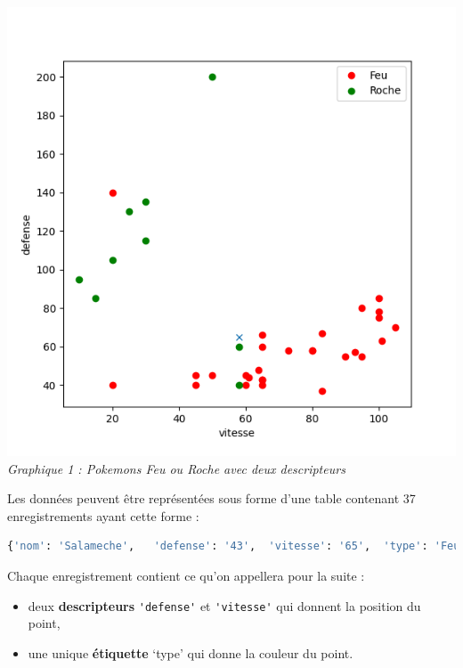 \documentclass[
  11pt,
]{article}
\newcommand{\passthrough}[1]{#1}
\providecommand{\tightlist}{%
  \setlength{\itemsep}{0pt}\setlength{\parskip}{0pt}}
\newcounter{def}
\begin{document}
\includegraphics[width=1\textwidth,height=\textheight]{images/pokemon-feu-roche-vitesse-defense.png}\\

\emph{Graphique 1 : Pokemons Feu ou Roche avec deux descripteurs}

Les données peuvent être représentées sous forme d'une table contenant
37 enregistrements ayant cette forme :

\begin{lstlisting}[language=Python]
{'nom': 'Salameche',   'defense': '43',  'vitesse': '65',  'type': 'Feu'}
\end{lstlisting}

Chaque enregistrement contient ce qu'on appellera pour la suite :

\begin{itemize}
\tightlist
\item
  deux \textbf{descripteurs} \passthrough{\lstinline!'defense'!} et
  \passthrough{\lstinline!'vitesse'!} qui donnent la position du point,
\item
  une unique \textbf{étiquette} `type' qui donne la couleur du point.
\end{itemize}
\end{document}
